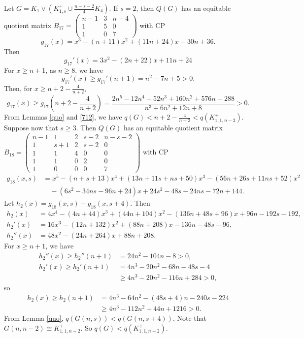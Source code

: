 \documentclass[12pt]{article}
\begin{document}
\begin{appendices}
Let $G= K_1\vee (K_{1,s}^+\cup \frac{n-s-2}{4}K_4)$.
If $s=2$, then
$Q(G)$ has an equitable quotient matrix
$
B_{17}=
\left(\begin{smallmatrix}
n-1 &   3 & n-4   \\
1  &  5 & 0\\
1 &  0 & 7
\end{smallmatrix}\right)$
with CP
\[
g_{17}(x)=x^3 - ( n + 11)x^2 + (11n + 24)x - 30n + 36.
\]
Then
\[
g_{17}'(x)=3x^2-(2n+22)x+11n+24
\]
For $x\ge n+1$, as $n\ge 8$, we have
\[
g_{17}'(x)\ge g_{17}'(n+1)=n^2 - 7n + 5>0.
\]
Then, for $x\ge n+2-\frac{4}{n+2}$,
\[
g_{17}(x)\ge g_{17}\left(n+2-\frac{4}{n+2}\right)=\frac{2n^5 - 12n^4 - 52n^3 + 160n^2 + 576n + 288}{n^3 + 6n^2 + 12n + 8}>0.
\]
From Lemmas \ref{quo} and \ref{712}, we have $q(G)<n+2-\frac{4}{n+2}<q(K_{1,1,n-2}^+)$.
Suppose now that $s\ge 3$.
Then
$Q(G)$ has an equitable quotient matrix
$B_{18}=
\left(\begin{smallmatrix}
n-1 & 1 &  2 &  s-2 & n-s-2   \\
1  & s+1 & 2 & s-2 & 0\\
1  & 1 & 4 & 0 & 0\\
1 &  1 & 0 & 2 & 0\\
1 & 0 & 0 & 0 &7
\end{smallmatrix}\right)$
with CP
\begin{align*}
g_{18}(x,s)&=x^5 - (n +s + 13)x^4 + (13n + 11s + ns + 50)x^3 - (56n + 26s + 11ns + 52)x^2 \\
&\quad - ( 6s^2 - 34ns - 96n + 24)x + 24s^2 - 48s - 24ns - 72n + 144.
\end{align*}
Let $h_2(x)=g_{18}(x,s)-g_{18}(x,s+4)$. Then
\begin{align*}
h_2(x)&=4x^4 -(4n+ 44)x^3 + (44n + 104)x^2 - (136n+48s + 96)x + 96n- 192s - 192,\\
h_2'(x)&=16x^3- (12n + 132)x^2 +(88n + 208)x - 136n- 48s - 96,\\
h_2''(x)&=48x^2 - ( 24n + 264)x + 88n + 208.
\end{align*}
For  $x\ge n+1$, we have
\begin{align*}
h_2''(x)\ge h_2''(n+1)&=24n^2 - 104n - 8>0,\\
h_2'(x)\ge h_2'(n+1)&=4n^3 - 20n^2 - 68n - 48s - 4\\
&\ge 4n^3 - 20n^2 - 116n + 284>0,
\end{align*}
so
\begin{align*}
h_2(x)\ge h_2(n+1)&=4n^3 - 64n^2 - (48s + 4)n - 240s - 224\\
&\ge 4n^3 - 112n^2 + 44n + 1216>0.
\end{align*}
From Lemma \ref{quo}, $q(G(n,s))<q(G(n,s+4))$.
Note that $G(n,n-2)\cong K_{1,1,n-2}^+$.
So $q(G)< q(K_{1,1,n-2}^+)$.
\end{appendices}
\end{document}
